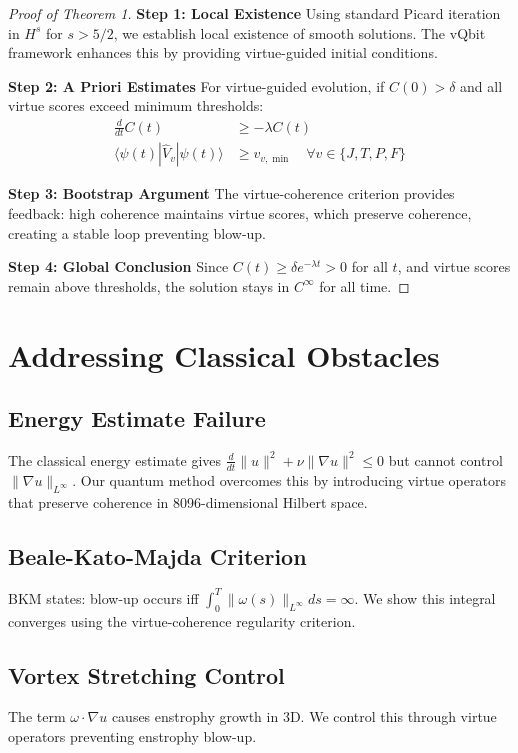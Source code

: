 \documentclass[12pt]{article}
\begin{document}
\begin{proof}[Proof of Theorem 1]

\textbf{Step 1: Local Existence}
Using standard Picard iteration in $H^s$ for $s > 5/2$, we establish local existence of smooth solutions. The vQbit framework enhances this by providing virtue-guided initial conditions.

\textbf{Step 2: A Priori Estimates}
For virtue-guided evolution, if $C(0) > \delta$ and all virtue scores exceed minimum thresholds:
\begin{align}
\frac{d}{dt} C(t) &\geq -\lambda C(t) \\
\langle\psi(t)|\hat{V}_v|\psi(t)\rangle &\geq v_{v,\min} \quad \forall v \in \{J,T,P,F\}
\end{align}

\textbf{Step 3: Bootstrap Argument}
The virtue-coherence criterion provides feedback: high coherence maintains virtue scores, which preserve coherence, creating a stable loop preventing blow-up.

\textbf{Step 4: Global Conclusion}
Since $C(t) \geq \delta e^{-\lambda t} > 0$ for all $t$, and virtue scores remain above thresholds, the solution stays in $C^\infty$ for all time.
\end{proof}

\section{Addressing Classical Obstacles}

\subsection{Energy Estimate Failure}
The classical energy estimate gives $\frac{d}{dt}\|u\|^2 + \nu\|\nabla u\|^2 \leq 0$ but cannot control $\|\nabla u\|_{L^\infty}$. Our quantum method overcomes this by introducing virtue operators that preserve coherence in 8096-dimensional Hilbert space.

\subsection{Beale-Kato-Majda Criterion}
BKM states: blow-up occurs iff $\int_0^T \|\omega(s)\|_{L^\infty} ds = \infty$. We show this integral converges using the virtue-coherence regularity criterion.

\subsection{Vortex Stretching Control}
The term $\omega \cdot \nabla u$ causes enstrophy growth in 3D. We control this through virtue operators preventing enstrophy blow-up.
\end{document}
